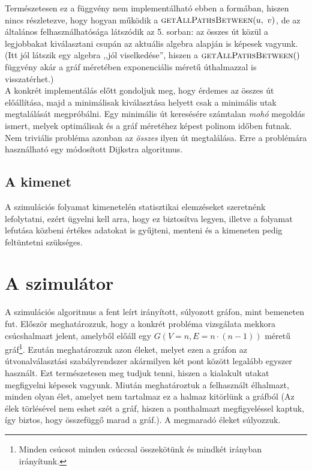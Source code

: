       Természetesen ez a függvény nem implementálható ebben a formában, hiszen nincs részletezve, hogy hogyan működik a $\Call{getAllPathsBetween}{u,~v}$, de az általános felhasználhatósága látszódik az 5. sorban: az összes út közül a legjobbakat kiválasztani csupán az aktuális algebra alapján is képesek vagyunk. (Itt jól látszik egy algebra ,,jól viselkedése'', hiszen a $\Call{getAllPathsBetween}$ függvény akár a gráf méretében exponenciális méretű úthalmazzal is visszatérhet.)\\

      A konkrét implementálás előtt gondoljuk meg, hogy érdemes az összes út előállítása, majd a minimálisak kiválasztása helyett csak a minimális utak megtalálását megpróbálni. Egy minimális út keresésére számtalan \textit{mohó} megoldás ismert, melyek optimálisak és a gráf méretéhez képest polinom időben futnak. Nem triviális probléma azonban az \textit{összes} ilyen út megtalálása. Erre a problémára használható egy módosított Dijkstra algoritmus.

    \subsection{A kimenet}
    A szimulációs folyamat kimenetelén statisztikai elemzéseket szeretnénk lefolytatni, ezért ügyelni kell arra, hogy ez biztosítva legyen, illetve a folyamat lefutása közbeni értékes adatokat is gyűjteni, menteni és a kimeneten pedig feltüntetni szükséges.\newpage

  \section{A szimulátor}\label{section_simulator}
  A szimulációs algoritmus a fent leírt irányított, súlyozott gráfon, mint bemeneten fut. Először meghatározzuk, hogy a konkrét probléma vizsgálata mekkora csúcshalmazt jelent, amelyből előáll egy $G(V=n, E=n \cdot (n-1))$ méretű gráf\footnote{Minden csúcsot minden csúccsal összekötünk és mindkét irányban irányítunk.}. Ezután meghatározzuk azon éleket, melyet ezen a gráfon az útvonalválasztási szabályrendszer akármilyen két pont között legalább egyszer használt. Ezt természetesen meg tudjuk tenni, hiszen a kialakult utakat megfigyelni képesek vagyunk. Miután meghatároztuk a felhasznált élhalmazt, minden olyan élet, amelyet nem tartalmaz ez a halmaz kitörlünk a gráfból (Az élek törlésével nem eshet szét a gráf, hiszen a ponthalmazt megfigyeléssel kaptuk, így biztos, hogy összefüggő marad a gráf.). A megmaradó éleket súlyozzuk.\\

